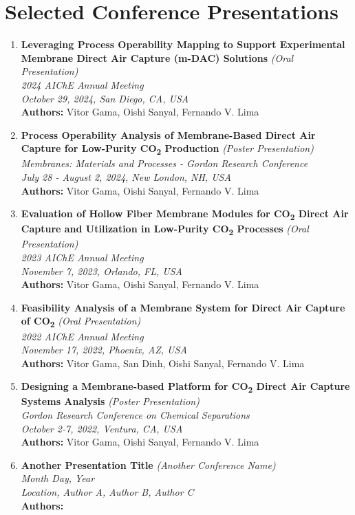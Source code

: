 \documentclass[letterpaper,11pt]{article}
\newcommand{\resumeConferenceHeading}[6]{
  \item 
    \textbf{#1} \textit{(#2)} \\ %
    \textit{#3} \\ %
    \textit{\small #4, #5} \\ %
    \small \textbf{Authors:} #6 %
}
\newcommand{\resumeSubHeadingListStart}{\begin{itemize}[leftmargin=0.15in, label={}]}
\newcommand{\resumeSubHeadingListEnd}{\end{itemize}}
\begin{document}
\section*{Selected Conference Presentations}
\begin{enumerate}
  \resumeConferenceHeading
    {Leveraging Process Operability Mapping to Support Experimental Membrane Direct Air Capture (m-DAC) Solutions}
    {Oral Presentation}
    {2024 AIChE Annual Meeting}
    {October 29, 2024}
    {San Diego, CA, USA}
    {Vitor Gama, Oishi Sanyal, Fernando V. Lima}
  \resumeConferenceHeading
    {Process Operability Analysis of Membrane-Based Direct Air Capture for Low-Purity CO\textsubscript{2} Production}
    {Poster Presentation}
    {Membranes: Materials and Processes - Gordon Research Conference}
    {July 28 - August 2, 2024}
    {New London, NH, USA}
    {Vitor Gama, Oishi Sanyal, Fernando V. Lima}
    \resumeConferenceHeading
    {Evaluation of Hollow Fiber Membrane Modules for CO\textsubscript{2} Direct Air Capture and Utilization in Low-Purity CO\textsubscript{2} Processes}
    {Oral Presentation}
    {2023 AIChE Annual Meeting}
    {November 7, 2023}
    {Orlando, FL, USA}
    {Vitor Gama, Oishi Sanyal, Fernando V. Lima}
    \resumeConferenceHeading
    {Feasibility Analysis of a Membrane System for Direct Air Capture of CO\textsubscript{2}}
    {Oral Presentation}
    {2022 AIChE Annual Meeting}
    {November 17, 2022}
    {Phoenix, AZ, USA}
    {Vitor Gama, San Dinh, Oishi Sanyal, Fernando V. Lima}
    \resumeConferenceHeading
    {Designing a Membrane-based Platform for CO\textsubscript{2} Direct Air Capture Systems Analysis}
    {Poster Presentation}
    {Gordon Research Conference on Chemical Separations}
    {October 2-7, 2022}
    {Ventura, CA, USA}
    {Vitor Gama, Oishi Sanyal, Fernando V. Lima}

    

  \resumeConferenceHeading
    {Another Presentation Title}
    {Another Conference Name}
    {Month Day, Year}
    {Location}
    {Author A, Author B, Author C}
\end{enumerate}

















    



\end{document}
